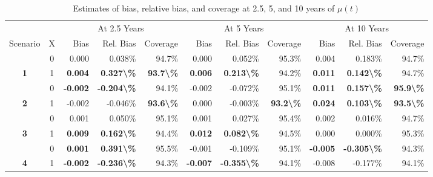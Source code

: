 \begin{table}

\caption{Estimates of bias, relative bias, and coverage at 2.5, 5, and 10 years of $\mu(t)$}
\centering
\begin{tabular}[t]{>{}ccrrrrrrrrr}
\toprule
\multicolumn{2}{c}{ } & \multicolumn{3}{c}{At 2.5 Years} & \multicolumn{3}{c}{At 5 Years} & \multicolumn{3}{c}{At 10 Years} \\
\cmidrule(l{3pt}r{3pt}){3-5} \cmidrule(l{3pt}r{3pt}){6-8} \cmidrule(l{3pt}r{3pt}){9-11}
Scenario & X & Bias & Rel. Bias & Coverage & Bias & Rel. Bias & Coverage & Bias & Rel. Bias & Coverage\\
\midrule
 & 0 & 0.000 & 0.038\% & 94.7\% & 0.000 & 0.052\% & 95.3\% & 0.004 & 0.183\% & 94.7\%\\

\multirow[t]{-2}{*}{\centering\arraybackslash \textbf{1}} & 1 & \textbf{ 0.004} & \textbf{ 0.327\textbackslash{}\%} & \textbf{93.7\textbackslash{}\%} & \textbf{ 0.006} & \textbf{ 0.213\textbackslash{}\%} & 94.2\% & \textbf{ 0.011} & \textbf{ 0.142\textbackslash{}\%} & 94.7\%\\

 & 0 & \textbf{-0.002} & \textbf{-0.204\textbackslash{}\%} & 94.1\% & -0.002 & -0.072\% & 95.1\% & \textbf{ 0.011} & \textbf{ 0.157\textbackslash{}\%} & \textbf{95.9\textbackslash{}\%}\\

\multirow[t]{-2}{*}{\centering\arraybackslash \textbf{2}} & 1 & -0.002 & -0.046\% & \textbf{93.6\textbackslash{}\%} & 0.000 & -0.003\% & \textbf{93.2\textbackslash{}\%} & \textbf{ 0.024} & \textbf{ 0.103\textbackslash{}\%} & \textbf{93.5\textbackslash{}\%}\\

 & 0 & 0.001 & 0.050\% & 95.1\% & 0.001 & 0.027\% & 95.4\% & 0.002 & 0.016\% & 94.7\%\\

\multirow[t]{-2}{*}{\centering\arraybackslash \textbf{3}} & 1 & \textbf{ 0.009} & \textbf{ 0.162\textbackslash{}\%} & 94.4\% & \textbf{ 0.012} & \textbf{ 0.082\textbackslash{}\%} & 94.5\% & 0.000 & 0.000\% & 95.3\%\\

\rule{0pt}{4ex}
 & 0 & \textbf{ 0.001} & \textbf{ 0.391\textbackslash{}\%} & 95.5\% & -0.001 & -0.109\% & 95.1\% & \textbf{-0.005} & \textbf{-0.305\textbackslash{}\%} & 94.3\%\\

\multirow[t]{-2}{*}{\centering\arraybackslash \textbf{4}} & 1 & \textbf{-0.002} & \textbf{-0.236\textbackslash{}\%} & 94.3\% & \textbf{-0.007} & \textbf{-0.355\textbackslash{}\%} & 94.1\% & -0.008 & -0.177\% & 94.1\%\\


\end{tabular}
\end{table}
